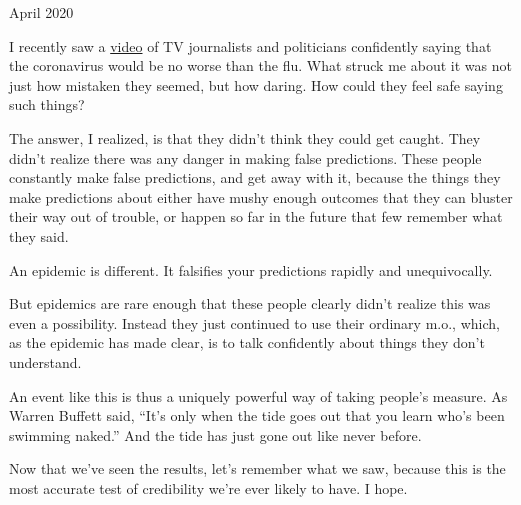 April 2020

I recently saw a
\href{https://www.youtube.com/watch?v=NAh4uS4f78o}{video} of TV
journalists and politicians confidently saying that the coronavirus
would be no worse than the flu. What struck me about it was not just how
mistaken they seemed, but how daring. How could they feel safe saying
such things?

The answer, I realized, is that they didn't think they could get caught.
They didn't realize there was any danger in making false predictions.
These people constantly make false predictions, and get away with it,
because the things they make predictions about either have mushy enough
outcomes that they can bluster their way out of trouble, or happen so
far in the future that few remember what they said.

An epidemic is different. It falsifies your predictions rapidly and
unequivocally.

But epidemics are rare enough that these people clearly didn't realize
this was even a possibility. Instead they just continued to use their
ordinary m.o., which, as the epidemic has made clear, is to talk
confidently about things they don't understand.

An event like this is thus a uniquely powerful way of taking people's
measure. As Warren Buffett said, ``It's only when the tide goes out that
you learn who's been swimming naked.'' And the tide has just gone out
like never before.

Now that we've seen the results, let's remember what we saw, because
this is the most accurate test of credibility we're ever likely to have.
I hope.
